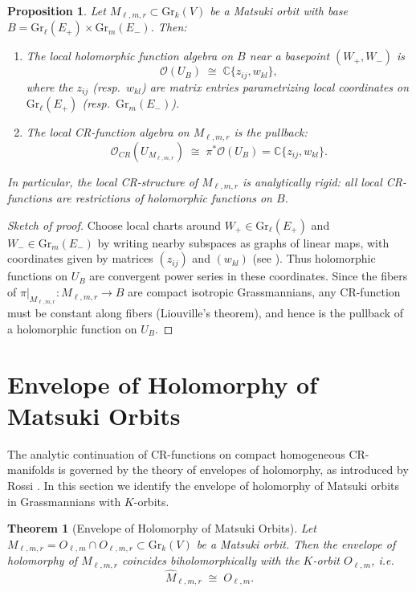 \documentclass[12pt,a4paper]{article}
\theoremstyle{plain}
\newtheorem{proposition}{Proposition}
\newtheorem{theorem}{Theorem}
\theoremstyle{definition}
\theoremstyle{remark}
\begin{document}
\begin{proposition}
Let $M_{\ell,m,r} \subset \mathrm{Gr}_k(V)$ be a Matsuki orbit with base 
$B = \mathrm{Gr}_\ell(E_+) \times \mathrm{Gr}_m(E_-)$. Then:
\begin{enumerate}
    \item The local holomorphic function algebra on $B$ near a basepoint 
    $(W_+,W_-)$ is
    \[
    \mathcal{O}(U_B) \;\cong\; \mathbb{C}\{ z_{ij}, w_{kl} \},
    \]
    where the $z_{ij}$ (resp.\ $w_{kl}$) are matrix entries parametrizing 
    local coordinates on $\mathrm{Gr}_\ell(E_+)$ (resp.\ $\mathrm{Gr}_m(E_-)$). 

    \item The local CR-function algebra on $M_{\ell,m,r}$ is the pullback:
    \[
    \mathcal{O}_{CR}(U_{M_{\ell,m,r}}) \;\cong\; 
    \pi^\ast \mathcal{O}(U_B) = \mathbb{C}\{ z_{ij}, w_{kl} \}.
    \]
\end{enumerate}
In particular, the local CR-structure of $M_{\ell,m,r}$ is analytically rigid: 
all local CR-functions are restrictions of holomorphic functions on $B$. 
\end{proposition}

\begin{proof}[Sketch of proof]
Choose local charts around $W_+ \in \mathrm{Gr}_\ell(E_+)$ and 
$W_- \in \mathrm{Gr}_m(E_-)$ by writing nearby subspaces as graphs of 
linear maps, with coordinates given by matrices $(z_{ij})$ and $(w_{kl})$ 
(see \cite[Ch.~1]{GriffithsHarris1978}). 
Thus holomorphic functions on $U_B$ are convergent power series in these 
coordinates. 
Since the fibers of 
$\pi|_{M_{\ell,m,r}} : M_{\ell,m,r} \to B$ 
are compact isotropic Grassmannians, any CR-function must be constant 
along fibers (Liouville’s theorem), and hence is the pullback of a 
holomorphic function on $U_B$. 
\end{proof}

\section{Envelope of Holomorphy of Matsuki Orbits}

The analytic continuation of CR-functions on compact homogeneous 
CR-manifolds is governed by the theory of envelopes of holomorphy, 
as introduced by Rossi \cite{Rossi1965}. 
In this section we identify the envelope of holomorphy of Matsuki orbits 
in Grassmannians with $K$-orbits. 

\begin{theorem}[Envelope of Holomorphy of Matsuki Orbits]
\label{thm:envelope}
Let $M_{\ell,m,r} = O_{\ell,m} \cap O_{\ell,m,r} \subset \mathrm{Gr}_k(V)$ 
be a Matsuki orbit. 
Then the envelope of holomorphy of $M_{\ell,m,r}$ coincides biholomorphically 
with the $K$-orbit $O_{\ell,m}$, i.e.
\[
\widehat{M}_{\ell,m,r} \;\cong\; O_{\ell,m}.
\]
\end{theorem}
\end{document}
